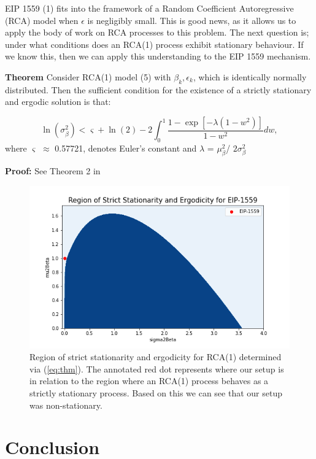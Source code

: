 \documentclass{article}
\begin{document}
EIP 1559 (1) fits into the framework of a Random Coefficient Autoregressive (RCA) model when $\epsilon$ is negligibly small. This is good news, as it allows us to apply the body of work on RCA processes to this problem. The next question is; under what conditions does an RCA(1) process exhibit stationary behaviour. If we know this, then we can apply this understanding to the EIP 1559 mechanism.

\textbf{Theorem} Consider RCA(1) model (5) with ${\beta_{k},\epsilon_{k}}$, which is identically normally distributed.  Then the sufficient condition for the existence of a strictly stationary and ergodic solution is that:

\begin{equation}
\ln(\sigma_{\beta}^2) < \varsigma + \ln(2) - 2 \int_{0}^{1}\frac{1 - \exp[-\lambda(1-w^2)]}{1-w^2}dw,
\label{eq:thm} 
\end{equation}
where $\varsigma$ $\approx$ 0.57721, denotes Euler’s constant and $\lambda$ = $\mu_{\beta}^2$/ $2\sigma_{\beta}^2$

\textbf{Proof:} See Theorem 2 in \cite{Wan03}

\begin{figure}
\centering
\includegraphics[width=5in]{strict_stationarity.png}
\caption{Region of strict stationarity and ergodicity for RCA(1) determined via (\ref{eq:thm}). The annotated red dot represents where our setup is in relation to the region where an RCA(1) process behaves as a strictly stationary process. Based on this we can see that our setup was non-stationary.} 
\label{fig:strict_stationarity}
\end{figure} 

\section{Conclusion}
\label{section:conclusion}
\end{document}
